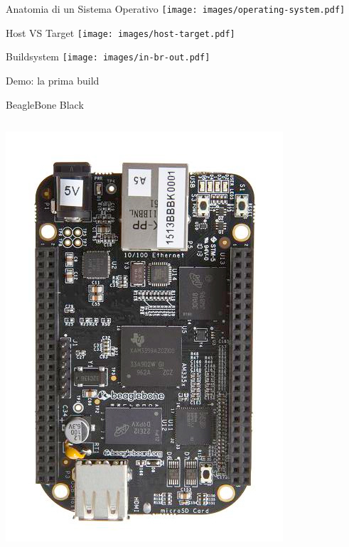 \documentclass[xetex,table]{beamer}
\begin{document}
\begin{frame}{Anatomia di un Sistema Operativo}
  \center\texttt{[image: images/operating-system.pdf]}
\end{frame}

\begin{frame}{Host VS Target}
  \center\texttt{[image: images/host-target.pdf]}
\end{frame}

\begin{frame}{Buildsystem}
  \center\texttt{[image: images/in-br-out.pdf]}
\end{frame}

\begin{frame}[standout]
  Demo: la prima build
\end{frame}

\begin{frame}{BeagleBone Black}
  \begin{columns}
    \includegraphics[width=\textwidth]{images/Beaglebone_Black.jpg}

\end{columns}
\end{frame}
\end{document}
